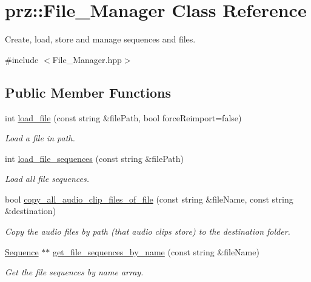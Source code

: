 \hypertarget{classprz_1_1_file___manager}{}\section{prz\+::File\+\_\+\+Manager Class Reference}
\label{classprz_1_1_file___manager}


Create, load, store and manage sequences and files.  




{\ttfamily \#include $<$File\+\_\+\+Manager.\+hpp$>$}

\subsection*{Public Member Functions}
\begin{DoxyCompactItemize}
\item 
int \mbox{\hyperlink{classprz_1_1_file___manager_aad862a71b68f6bb1870b1750f33e70f4}{load\+\_\+file}} (const string \&file\+Path, bool force\+Reimport=false)
\begin{DoxyCompactList}\small\item\em Load a file in path. \end{DoxyCompactList}\item 
int \mbox{\hyperlink{classprz_1_1_file___manager_a930093b7f609e4f9cf755efb0d91ef46}{load\+\_\+file\+\_\+sequences}} (const string \&file\+Path)
\begin{DoxyCompactList}\small\item\em Load all file sequences. \end{DoxyCompactList}\item 
bool \mbox{\hyperlink{classprz_1_1_file___manager_a56563f65f4b2cfa34e4393ae34a0afd3}{copy\+\_\+all\+\_\+audio\+\_\+clip\+\_\+files\+\_\+of\+\_\+file}} (const string \&file\+Name, const string \&destination)
\begin{DoxyCompactList}\small\item\em Copy the audio files by path (that audio clips store) to the destination folder. \end{DoxyCompactList}\item 
\mbox{\hyperlink{classprz_1_1_sequence}{Sequence}} $\ast$$\ast$ \mbox{\hyperlink{classprz_1_1_file___manager_a9e617521f5fa135f8ecb4b967eed4b7c}{get\+\_\+file\+\_\+sequences\+\_\+by\+\_\+name}} (const string \&file\+Name)
\begin{DoxyCompactList}\small\item\em Get the file sequences by name array. \end{DoxyCompactList}\item 
$$
\end{DoxyCompactItemize}
